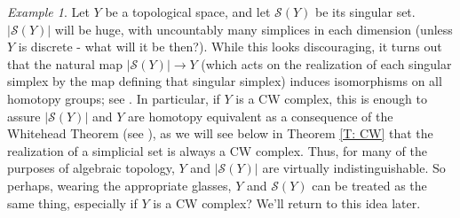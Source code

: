 \documentclass[12pt]{article}
\theoremstyle{plain}
\theoremstyle{definition}
\theoremstyle{remark}
\newtheorem{example}[theorem]{Example}
\newcommand{\ms}[1]{\mathscr{#1}}
\begin{document}
\begin{example}
Let $Y$ be a topological space, and let $\ms S(Y)$ be its singular set. $|\ms S(Y)|$ will be huge, with uncountably many simplices in each dimension (unless $Y$ is discrete - what will it be then?). While this looks discouraging, it turns out that  the natural map $|\ms S(Y)|\to Y$ (which acts on the realization  of each singular simplex by the map defining that singular simplex) induces isomorphisms on all homotopy  groups; see \cite[Theorem 4]{Mi57}. In particular, if $Y$ is a CW complex, this is enough to assure $|\ms S(Y)|$ and $Y$ are homotopy equivalent as a consequence of the Whitehead Theorem (see \cite[Corollary VII.11.14]{BRTG}), as we will see below in Theorem \ref{T: CW} that the realization of a simplicial set is always a CW complex. Thus, for many of the purposes of algebraic topology, $Y$ and $|\ms S(Y)|$ are virtually indistinguishable. So perhaps, wearing the appropriate glasses, $Y$ and $\ms S(Y)$ can be treated as the same thing, especially if $Y$ is a CW complex? We'll return to this idea later.
\end{example}
\end{document}
